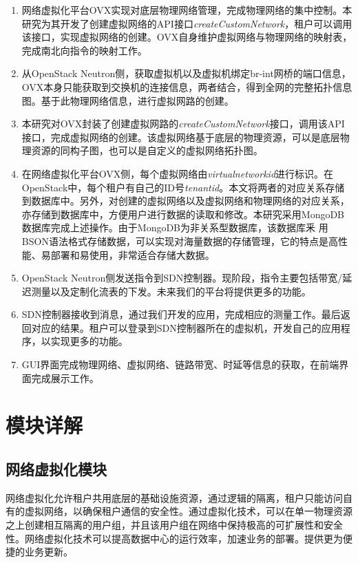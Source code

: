 \begin{enumerate}
\item 网络虚拟化平台OVX实现对底层物理网络管理，完成物理网络的集中控制。本研究为其开发了创建虚拟网络的API接口\emph{createCustomNetwork}，租户可以调用该接口，实现虚拟网络的创建。OVX自身维护虚拟网络与物理网络的映射表，完成南北向指令的映射工作。
\item 从OpenStack Neutron侧，获取虚拟机以及虚拟机绑定br-int网桥的端口信息，OVX本身只能获取到交换机的连接信息，两者结合，得到全网的完整拓扑信息图。基于此物理网络信息，进行虚拟网路的创建。
\item 本研究对OVX封装了创建虚拟网路的\emph{createCustomNetwork}接口，调用该API接口，完成虚拟网络的创建。该虚拟网络基于底层的物理资源，可以是底层物理资源的同构子图，也可以是自定义的虚拟网络拓扑图。
\item 在网络虚拟化平台OVX侧，每个虚拟网络由\emph{virtualnetworkid}进行标识。在OpenStack中，每个租户有自己的ID号\emph{tenantid}。本文将两者的对应关系存储到数据库中。另外，对创建的虚拟网络以及虚拟网络和物理网络的对应关系，亦存储到数据库中，方便用户进行数据的读取和修改。本研究采用MongoDB数据库完成上述操作。由于MongoDB为非关系型数据库，该数据库釆
用BSON语法格式存储数据，可以实现对海量数据的存储管理，它的特点是高性能、易部署和易使用，非常适合存储大数据\cite{mongodb}。

\item OpenStack Neutron侧发送指令到SDN控制器。现阶段，指令主要包括带宽/延迟测量以及定制化流表的下发。未来我们的平台将提供更多的功能。
\item SDN控制器接收到消息，通过我们开发的应用，完成相应的测量工作。最后返回对应的结果。租户可以登录到SDN控制器所在的虚拟机，开发自己的应用程序，以实现更多的功能。
\item GUI界面完成物理网络、虚拟网络、链路带宽、时延等信息的获取，在前端界面完成展示工作。
\end{enumerate}

\section{模块详解}
\subsection{网络虚拟化模块}
网络虚拟化允许租户共用底层的基础设施资源，通过逻辑的隔离，租户只能访问自有的虚拟网络，以确保租户通信的安全性。通过虚拟化技术，可以在单一物理资源之上创建相互隔离的用户组，并且该用户组在网络中保持极高的可扩展性和安全性。网络虚拟化技术可以提高数据中心的运行效率，加速业务的部署。提供更为便捷的业务更新。

